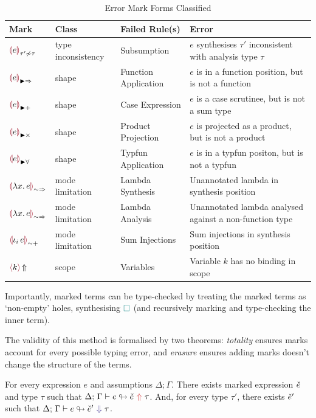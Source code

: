 \begin{table}[h]
\centering
\small
\begin{tabularx}{\linewidth}{lll : X}
\toprule
\textbf{Mark} & \textbf{Class} & \textbf{Failed Rule(s)} & \textbf{Error} \\
\midrule
$\markincon[e]{\tau'}{\tau}$ & type inconsistency & Subsumption & $e$ synthesises $\tau'$ inconsistent with analysis type $\tau$ \\
$\markarrow[e]$       & shape & Function Application & $e$ is in a function position, but is not a function \\
$\marksum[e]$         & shape & Case Expression & $e$ is a case scrutinee, but is not a sum type \\
$\markprod[e]$        & shape & Product Projection & $e$ is projected as a product, but is not a product \\
$\markforall[e]$      & shape & Typfun Application & $e$ is in a typfun positon, but is not a typfun \\
$\marklam[\lambda x.\,e]$ & mode limitation & Lambda Synthesis & Unannotated lambda in synthesis position \\
$\marklam[\lambda x.\,e]$ & mode limitation & Lambda Analysis  & Unannotated lambda analysed against a non-function type \\
$\markinj[\iota_i\,e]$    & mode limitation & Sum Injections   & Sum injections in synthesis position \\
$\markvar{k}$      & scope & Variables & Variable $k$ has no binding in scope \\
\bottomrule
\end{tabularx}
\caption{Error Mark Forms Classified}
\label{tab:mark-forms}
\end{table}

Importantly, marked terms can be type-checked by treating the marked terms as `non-empty' holes, synthesising ${\color{teal}\Box}$ (and recursively marking and type-checking the inner term).

The validity of this method is formalised by two theorems: \textit{totality} ensures marks account for every possible typing error, and \textit{erasure} ensures adding marks doesn't change the structure of the terms.

\begin{theorem}
\label{thm:mark-total}
For every expression $e$ and assumptions $\Delta;\Gamma$. There exists marked expression $\check{e}$ and type $\tau$ such that
$\synmark{e}{\chk e}{\tau}$. And, for every type $\tau'$, there exists
$\check{e}'$ such that $\anamark{e}{\chk e'}{\tau}$.
\end{theorem}

